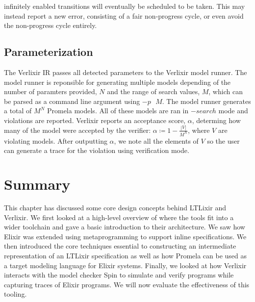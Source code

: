 infinitely enabled transitions will eventually be scheduled to be taken. This may instead report a new error, consisting of a fair non-progress cycle, or even avoid the non-progress cycle entirely.  
\subsection{Parameterization}
The Verlixir IR passes all detected parameters to the Verlixir model runner. The model runner is reponsible for generating multiple models depending of the number of paramters provided, $N$ and the range of search values, $M$, which can be parsed as a command line argument using $-p\text{ }M$. The model runner generates a total of $M^N$ Promela models. All of these models are ran in $-search$ mode and violations are reported. Verlixir reports an acceptance score, $\alpha$, determing how many of the model were accepted by the verifier: $\alpha \coloneq 1 - \frac{|V|}{M^N}$, where $V$ are violating models. After outputting $\alpha$, we note all the elements of $V$ so the user can generate a trace for the violation using verification mode.

\section{Summary}
This chapter has discussed some core design concepts behind LTLixir and Verlixir. We first looked at a high-level overview of where the tools fit into a wider toolchain and gave a basic introduction to their architecture. We saw how Elixir was extended using metaprogramming to support inline specifications. We then introduced the core techniques essential to constructing an intermediate representation of an LTLixir specification as well as how Promela can be used as a target modeling language for Elixir systems. Finally, we looked at how Verlixir interacts with the model checker Spin to simulate and verify programs while capturing traces of Elixir programs. We will now evaluate the effectiveness of this tooling.
